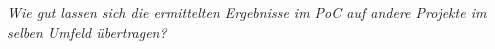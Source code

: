 
\textit{Wie gut lassen sich die ermittelten Ergebnisse im PoC auf andere Projekte im selben Umfeld übertragen?}